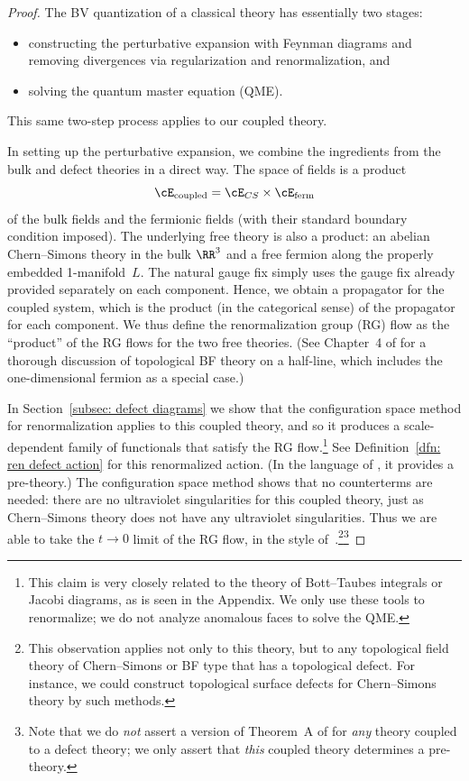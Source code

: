 \documentclass[10pt]{amsart}
\begin{document}
\begin{proof}
The BV quantization of a classical theory has essentially two stages:
\begin{itemize}
\item constructing the perturbative expansion with Feynman diagrams and removing divergences via regularization and renormalization, and 
\item solving the quantum master equation (QME).
\end{itemize}
This same two-step process applies to our coupled theory.

In setting up the perturbative expansion, 
we combine the ingredients from the bulk and defect theories in a direct way.
The space of fields is a product 
\[
\cE_{\rm coupled} = \cE_{CS} \times \cE_{\rm ferm}
\]
of the bulk fields and the fermionic fields (with their standard boundary condition imposed).
The underlying free theory is also a product: 
an abelian Chern--Simons theory in the bulk $\RR^3$ and a free fermion along the properly embedded 1-manifold~$L$.
The natural gauge fix simply uses the gauge fix already provided separately on each component.
Hence, we obtain a propagator for the coupled system, 
which is the product (in the categorical sense) of the propagator for each component.
We thus define the renormalization group (RG) flow as the ``product'' of the RG flows for the two free theories. 
(See Chapter~4 of \cite{RabThesis} for a thorough discussion of topological BF theory on a half-line,
which includes the one-dimensional fermion as a special case.)

In Section~\ref{subsec: defect diagrams} we show that the configuration space method for renormalization applies to this coupled theory,
and so it produces a scale-dependent family of functionals that satisfy the RG flow.\footnote{This claim is very closely related to the theory of Bott--Taubes integrals or Jacobi diagrams, as is seen in the Appendix. We only use these tools to renormalize; we do not analyze anomalous faces to solve the QME.}
See Definition~\ref{dfn: ren defect action} for this renormalized action.
(In the language of \cite{CosBook}, it provides a pre-theory.)
The configuration space method shows  that no counterterms are needed:
there are no ultraviolet singularities for this coupled theory,
just as Chern--Simons theory does not have any ultraviolet singularities.
Thus we are able to take the $ t\to 0$ limit of the RG flow, in the style of~\cite{CosBook}.\footnote{This observation applies not only to this theory, but to any topological field theory of Chern--Simons or BF type that has a topological defect. 
For instance, we could construct topological surface defects for Chern--Simons theory by such methods.}\footnote{Note that we do {\em not} assert a version of Theorem~A of \cite{CosBook} for {\em any} theory coupled to a defect theory;
we only assert that {\em this} coupled theory determines a pre-theory.}


\end{proof}
\end{document}
